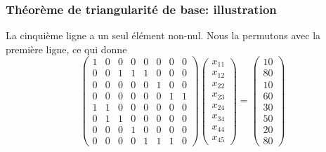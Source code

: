 \documentclass[usepdftitle=false, aspectratio=169]{beamer}
\begin{document}
\begin{frame}
\frametitle{Théorème de triangularité de base: illustration}

La cinquième ligne a un seul élément non-nul. Nous la permutons avec la première ligne, ce qui donne
\[
\begin{pmatrix}
 1 & 0 & 0 & 0 & 0 & 0 & 0 & 0 \\
 0 & 0 & 1 & 1 & 1 & 0 & 0 & 0 \\
 0 & 0 & 0 & 0 & 0 & 1 & 0 & 0 \\
 0 & 0 & 0 & 0 & 0 & 0 & 1 & 1 \\
 1 & 1 & 0 & 0 & 0 & 0 & 0 & 0 \\
 0 & 1 & 1 & 0 & 0 & 0 & 0 & 0 \\
 0 & 0 & 0 & 1 & 0 & 0 & 0 & 0 \\
 0 & 0 & 0 & 0 & 1 & 1 & 1 & 0
\end{pmatrix}
\begin{pmatrix}
x_{11} \\
x_{12} \\
x_{22} \\
x_{23} \\
x_{24} \\
x_{34} \\
x_{44} \\
x_{45}
\end{pmatrix}
=
\begin{pmatrix}
10 \\
80 \\
10 \\
60 \\
30 \\
50 \\
20 \\
80
\end{pmatrix}
\]

\end{frame}
\end{document}
